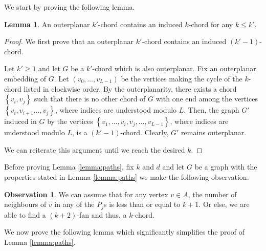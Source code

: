 \documentclass[12pt]{article}
\theoremstyle{definition}
\newtheorem{lemma}[thm]{Lemma}
\newtheorem{obs}[thm]{Observation}
\begin{document}
    We start by proving the following
    lemma.

    \begin{lemma} \label{lemma:outerplanar}
        An outerplanar $k'$-chord contains
        an induced $k$-chord for any $k \leq k'$.
    \end{lemma}
    \begin{proof}
        We first prove that an outerplanar
        $k'$-chord contains an induced
        $\left(k'-1\right)$-chord.

        Let $k' \geq 1$ and let $G$ 
        be a $k'$-chord which is also 
        outerplanar. Fix an outerplanar
        embedding of $G$.
        Let $\left(v_0, \ldots, v_{L-1}\right)$ 
        be the vertices making the cycle
        of the $k$-chord listed in clockwise
        order. By the outerplanarity,
        there exists a chord $\left\{v_{i}, v_{j}\right\}$ 
        such that there is no other chord
        of $G$ with one end among the
        vertices $\left\{v_{i}, v_{i+1} \ldots, v_{j}\right\}$,
        where indices are understood modulo $L$.
        Then, the graph $G'$ induced in $G$ by
        the vertices $\left\{v_1, \ldots, v_{i},
        v_{j}, \ldots, v_{L-1}\right\}$,
        where indices are understood modulo $L$,
        is a $\left(k'-1\right)$-chord.
        Clearly, $G'$ remains outerplanar.

        We can reiterate this argument until 
        we reach the desired $k$.
    \end{proof}
    
    Before proving Lemma \ref{lemma:paths},
    fix $k$ and $d$ and let $G$ be a graph
    with the properties stated in Lemma \ref{lemma:paths}
    we make the following observation.

    \begin{obs} \label{obs:kfan}
        We can assume that
        for any vertex $v \in A$,
        the number of neighbours of $v$ in any of
        the $P_{j}$s is less than or
        equal to $k+1$. Or else, we
        are able to find a
        $\left(k+2\right)$-fan and thus,
        a $k$-chord.
    \end{obs}

    We now prove the following lemma
    which significantly simplifies
    the proof of Lemma \ref{lemma:paths}.
    
\end{document}
